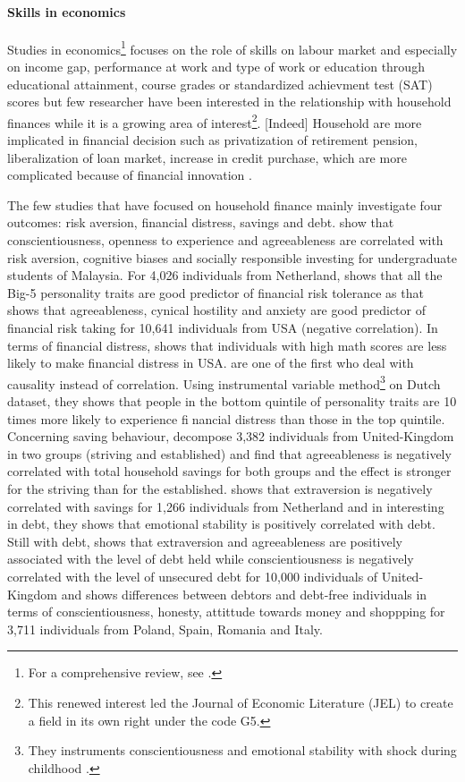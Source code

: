 \documentclass[a4paper, 11pt, onecolumn]{article}
\begin{document}
\paragraph*{Skills in economics}
Studies in economics\footnote{For a comprehensive review, see \cite{Almlund2011}.} focuses on the role of skills on labour market and especially on income gap, performance at work and type of work or education through  educational attainment, course grades or standardized achievment test (SAT) scores but few researcher have been interested in the relationship with household finances while it is a growing area of interest\footnote{This renewed interest led the Journal of Economic Literature (JEL) to create a field in its own right under the code G5.}.
[Indeed] Household are more implicated in financial decision such as privatization of retirement pension, liberalization of loan market, increase in credit purchase, which are more complicated because of financial innovation \citep{Guiso2013}.

The few studies that have focused on household finance mainly investigate four outcomes: risk aversion, financial distress, savings and debt.
\cite{Nga2013} show that conscientiousness, openness to experience and agreeableness are correlated with risk aversion, cognitive biases and socially responsible investing for undergraduate students of Malaysia.
For 4,026 individuals from Netherland, \cite{Pinjisakikool2017} shows that all the Big-5 personality traits are good predictor of financial risk tolerance as \cite{Bucciol2017} that shows that agreeableness, cynical hostility and anxiety are good predictor of financial risk taking for 10,641 individuals from USA (negative correlation).
In terms of financial distress, \cite{Agarwal2013} shows that individuals with high math scores are less likely to make financial distress in USA.
\cite{Parise2019} are one of the first who deal with causality instead of correlation.
Using instrumental variable method\footnote{They instruments conscientiousness and emotional stability with shock during childhood .} on Dutch dataset, they shows that people in the bottom quintile of personality traits are 10 times more likely to experience financial distress than those in the top quintile.
Concerning saving behaviour, \cite{Gerhard2018} decompose 3,382 individuals from United-Kingdom in two groups (striving and established) and find that agreeableness is negatively correlated with total household savings for both groups and the effect is stronger for the striving than for the established.
\cite{Nyhus2001} shows that extraversion is negatively correlated with savings for 1,266 individuals from Netherland and in interesting in debt, they shows that emotional stability is positively correlated with debt.
Still with debt, \cite{Brown2014} shows that extraversion and agreeableness are positively associated with the level of debt held while conscientiousness is negatively correlated with the level of unsecured debt for 10,000 individuals of United-Kingdom and \cite{Forlicz2019} shows differences between debtors and debt-free individuals in terms of conscientiousness, honesty, attittude towards money and shoppping for 3,711 individuals from Poland, Spain, Romania and Italy.
\end{document}
